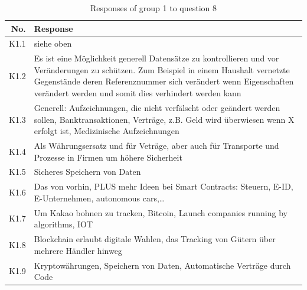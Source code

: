 \begin{table}[H]
    \centering
    \begin{tabularx}{\textwidth}{r|X}
        No. & Response \\ \hline
         K1.1 & siehe oben\\
         K1.2 & Es ist eine Möglichkeit generell Datensätze zu kontrollieren und vor Veränderungen zu schützen. Zum Beispiel in einem Haushalt vernetzte Gegenstände deren Referenznummer sich verändert wenn Eigenschaften verändert werden und somit dies verhindert werden kann\\
         K1.3 & Generell: Aufzeichnungen, die nicht verfälscht oder geändert werden sollen, Banktransaktionen, Verträge, z.B. Geld wird überwiesen wenn X erfolgt ist, Medizinische Aufzeichnungen  \\
         K1.4 & Als Währungsersatz und für Veträge, aber auch für Transporte und Prozesse in Firmen um höhere Sicherheit  \\
         K1.5 & Sicheres Speichern von Daten\\
         K1.6 & Das von vorhin, PLUS mehr Ideen bei Smart Contracts: Steuern, E-ID, E-Unternehmen, autonomous cars,… \\
         K1.7 & Um Kakao bohnen zu tracken, Bitcoin, Launch companies running by algorithms, IOT \\
         K1.8 & Blockchain erlaubt digitale Wahlen, das Tracking von Gütern über mehrere Händler hinweg \\
         K1.9 & Kryptowährungen, Speichern von Daten, Automatische Verträge durch Code \\
    \end{tabularx}
    \caption{Responses of group 1 to question 8}
    \label{tab:Video8}
\end{table}


